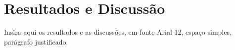 \section{Resultados e Discussão}

Insira aqui os resultados e as discussões, em fonte Arial 12, espaço simples, parágrafo justificado.

